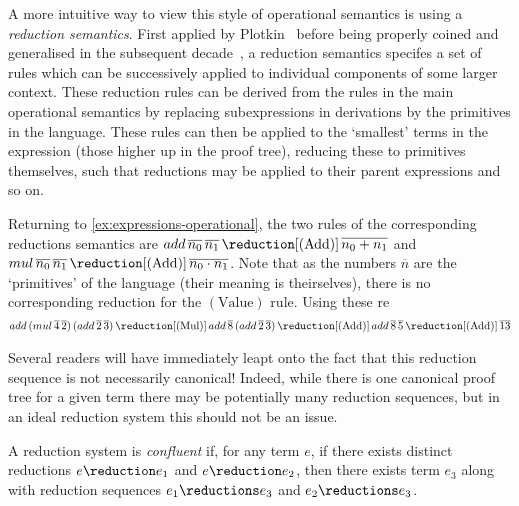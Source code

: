 A more intuitive way to view this style of operational semantics is using
a \emph{reduction semantics}.
First applied by Plotkin~\cite{plotkin1975callbyname} before being properly
coined and generalised in the subsequent
decade~\cite{felleisen1987reduction,felleisen1987calculi}, a reduction semantics
specifes a set of rules which can be successively applied to individual
components of some larger context. These reduction rules can be derived from
the rules in the main operational semantics by replacing subexpressions in
derivations by the primitives in the language.
These rules can then be applied to the `smallest' terms in the expression
(those higher up in the proof tree), reducing these to primitives themselves,
such that reductions may be applied to their parent expressions and so on.

\begin{example}\label{ex:expressions-reduction}
    Returning to \cref{ex:expressions-operational}, the two rules of the
    corresponding reductions semantics are \(
    add \, \overline{n_0} \, \overline{n_1}
    \,\reduction[(\text{Add})]\,
    \overline{n_0 + n_1}
    \) and \(
    mul \, \overline{n_0} \, \overline{n_1}
    \,\reduction[(\text{Add})]\,
    \overline{n_0 \cdot n_1}
    \).
    Note that as the numbers \(\overline{n}\) are the `primitives' of the
    language (their meaning is theirselves), there is no corresponding reduction
    for the \((\text{Value})\) rule.
    Using these re
    \begin{gather*}
        add \, (mul \, \overline{4} \, \overline{2}) \, (add \, \overline{2} \, \overline{3})
        \,\reduction[(\text{Mul})]\,
        add \, \overline{8} \, (add \, \overline{2} \, \overline{3})
        \,\reduction[(\text{Add})]\,
        add \, \overline{8} \, \overline{5}
        \,\reduction[(\text{Add})]\,
        \overline{13}
    \end{gather*}
\end{example}

Several readers will have immediately leapt onto the fact that this reduction
sequence is not necessarily canonical!
Indeed, while there is one canonical proof tree for a given term there may be
potentially many reduction sequences, but in an ideal reduction system this
should not be an issue.

\begin{definition}
    A reduction system is \emph{confluent} if, for any term \(e\), if there
    exists distinct reductions \(e \reduction e_1\) and \(e \reduction e_2\),
    then there exists term \(e_3\) along with reduction sequences
    \(e_1 \reductions e_3\) and \(e_2 \reductions e_3\).
\end{definition}

